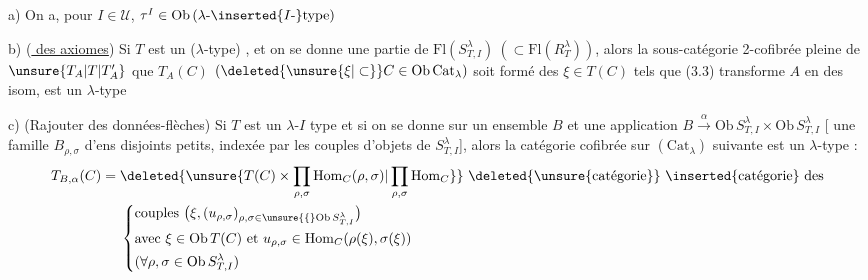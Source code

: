 a)  On a,  pour $I\in\mathcal U$,
$\tau^I\in\mathrm{Ob}\,(\lambda\text{-}\inserted{I\text{-}}\mathrm{type})$

b) (\uline{ des axiomes})  Si $T$ est un ($\lambda$-type) , et
on se donne une  partie  de $\mathrm{Fl}(S_{T,I}^{\lambda})\ (\subset\mathrm{Fl}(R_T^\lambda))$, alors
la sous-catégorie 2-cofibrée pleine de $\unsure{T_A|T|T'_A}$   que
$T_A(C)$ $(\deleted{\unsure{\xi|\subset}}C\in\mathrm{Ob}\,\mathrm{Cat}_\lambda)$ soit formé des $\xi\in T(C)$ tels
que (3.3) transforme $A$ en des isom, est un $\lambda$-type

c) (Rajouter des données-flèches) Si $T$ est un $\lambda$-$I$ type 
et si on se donne  sur un  ensemble
$B$ et une application $B\xrightarrow{\alpha}\mathrm{Ob}\,S_{T,I}^{\lambda}\times\mathrm{Ob}\,S_{T,I}^{\lambda}$  [ une famille $B_{\rho,\sigma}$ d'ens disjoints
 petits, indexée par les couples d'objets
de $S_{T,I}^\lambda$], alors la catégorie cofibrée sur $(\mathrm{Cat}_{\lambda})$
suivante est un $\lambda$-type :
{\small
\[
\begin{aligned}
 T_{B,\alpha}(C)={}&\deleted{\unsure{T(C)\times\prod_{\rho,\sigma}\mathrm{Hom}_{C}(\rho,\sigma)|\prod_{\rho,\sigma}\mathrm{Hom}_{C}}}\
 \text{\deleted{\unsure{catégorie}} \inserted{catégorie} des}\\
 &\left\{\begin{aligned}
 &\text{couples }\bigl(\xi,(u_{\rho,\sigma})_{\rho,\sigma\in\unsure{\{}\mathrm{Ob}\,S_{T,I}^\lambda}\bigr)\\
 &\text{avec }\xi\in\mathrm{Ob}\,T(C)\text{ et }u_{\rho,\sigma}\in\mathrm{Hom}_{C}(\rho(\xi),\sigma(\xi))\\
 &(\forall\rho,\sigma\in\mathrm{Ob}\,S_{T,I}^\lambda)
 \end{aligned}\right.
\end{aligned}
\]
}


